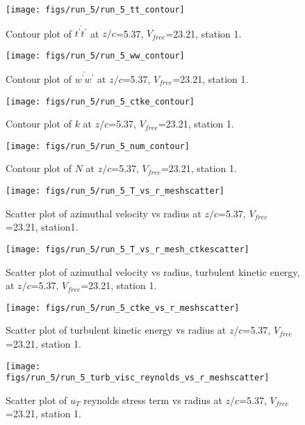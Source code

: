 \begin{figure}[H]
\centering
\texttt{[image: figs/run\_5/run\_5\_tt\_contour]}
\caption{Contour plot of $\overline{t^\prime t^\prime}$ at $z/c$=5.37, $V_{free}$=23.21, station 1.}
\end{figure}


\begin{figure}[H]
\centering
\texttt{[image: figs/run\_5/run\_5\_ww\_contour]}
\caption{Contour plot of $\overline{w^\prime w^\prime}$ at $z/c$=5.37, $V_{free}$=23.21, station 1.}
\end{figure}


\begin{figure}[H]
\centering
\texttt{[image: figs/run\_5/run\_5\_ctke\_contour]}
\caption{Contour plot of $k$ at $z/c$=5.37, $V_{free}$=23.21, station 1.}
\end{figure}


\begin{figure}[H]
\centering
\texttt{[image: figs/run\_5/run\_5\_num\_contour]}
\caption{Contour plot of $N$ at $z/c$=5.37, $V_{free}$=23.21, station 1.}
\end{figure}


\begin{figure}[H]
\centering
\texttt{[image: figs/run\_5/run\_5\_T\_vs\_r\_meshscatter]}
\caption{Scatter plot of azimuthal velocity vs radius at $z/c$=5.37, $V_{free}$=23.21, station1.}
\end{figure}


\begin{figure}[H]
\centering
\texttt{[image: figs/run\_5/run\_5\_T\_vs\_r\_mesh\_ctkescatter]}
\caption{Scatter plot of azimuthal velocity vs radius, turbulent kinetic energy, at $z/c$=5.37, $V_{free}$=23.21, station 1.}
\end{figure}


\begin{figure}[H]
\centering
\texttt{[image: figs/run\_5/run\_5\_ctke\_vs\_r\_meshscatter]}
\caption{Scatter plot of turbulent kinetic energy vs radius at $z/c$=5.37, $V_{free}$=23.21, station 1.}
\end{figure}


\begin{figure}[H]
\centering
\texttt{[image: figs/run\_5/run\_5\_turb\_visc\_reynolds\_vs\_r\_meshscatter]}
\caption{Scatter plot of $
u_T$ reynolds stress term vs radius at $z/c$=5.37, $V_{free}$=23.21, station 1.}
\end{figure}


